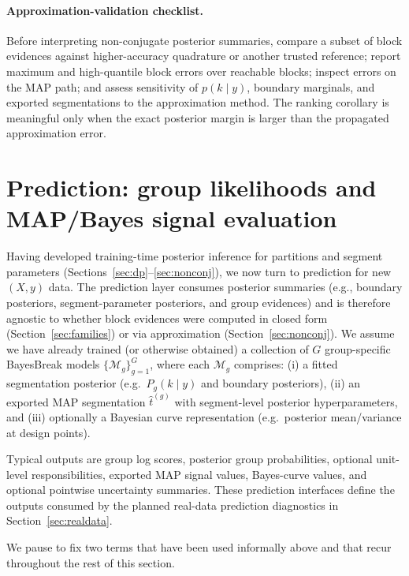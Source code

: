 \paragraph{Approximation-validation checklist.}
Before interpreting non-conjugate posterior summaries, compare a subset of block evidences against
higher-accuracy quadrature or another trusted reference; report maximum and high-quantile block
errors over reachable blocks; inspect errors on the MAP path; and assess sensitivity of $p(k\mid y)$,
boundary marginals, and exported segmentations to the approximation method. The ranking corollary
is meaningful only when the exact posterior margin is larger than the propagated approximation error.

\section{Prediction: group likelihoods and MAP/Bayes signal evaluation}
\label{sec:prediction}

Having developed training-time posterior inference for partitions and segment parameters (Sections~\ref{sec:dp}--\ref{sec:nonconj}), we now turn to prediction for new $(X,y)$ data.
The prediction layer consumes posterior summaries (e.g., boundary posteriors, segment-parameter posteriors, and group evidences) and is therefore agnostic to whether block evidences were computed in closed form (Section~\ref{sec:families}) or via approximation (Section~\ref{sec:nonconj}). We assume we have already trained (or otherwise obtained)
a collection of $G$ group-specific BayesBreak models
$\{\mathcal{M}_g\}_{g=1}^G$, where each $\mathcal{M}_g$ comprises:
(i) a fitted segmentation posterior (e.g.\ $P_g(k\mid y)$ and boundary posteriors),
(ii) an exported MAP segmentation $\widehat{t}^{(g)}$ with segment-level posterior
hyperparameters, and (iii) optionally a Bayesian curve representation
(e.g.\ posterior mean/variance at design points).

Typical outputs are group log scores, posterior group probabilities, optional unit-level
responsibilities, exported MAP signal values, Bayes-curve values, and optional pointwise
uncertainty summaries. These prediction interfaces define the outputs consumed by the planned real-data prediction diagnostics in Section~\ref{sec:realdata}.

We pause to fix two terms that have been used informally above and that recur throughout the rest of this section.

